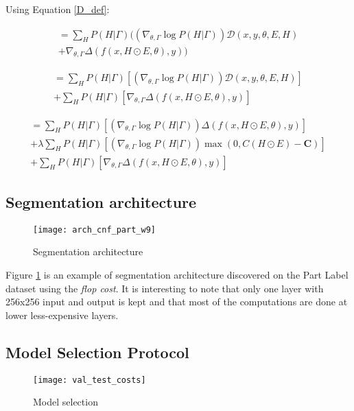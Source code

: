 \documentclass[10pt,twocolumn,letterpaper]{article}
\begin{document}
Using Equation \ref{D_def}:

\begin{multline}
= \sum\limits_H P(H|\Gamma) ((\nabla_{\theta,\Gamma} \log P(H|\Gamma)) \mathcal{D}(x,y,\theta,E,H) \\+ \nabla_{\theta,\Gamma} \Delta(f(x,H \odot E,\theta),y) )
\end{multline}

\begin{multline}
= \sum\limits_H P(H|\Gamma) \left[(\nabla_{\theta,\Gamma}  \log P(H|\Gamma)) \mathcal{D}(x,y,\theta,E,H) \right] \\+ \sum\limits_H P(H|\Gamma) \left[ \nabla_{\theta,\Gamma} \Delta(f(x,H \odot E,\theta),y) \right]
\end{multline}

\begin{multline}
= \sum\limits_H P(H|\Gamma) \left[ (\nabla_{\theta,\Gamma}  \log P(H|\Gamma)) \Delta(f(x,H \odot E,\theta),y) \right]\\
+ \lambda \sum\limits_H P(H|\Gamma) \left[ (\nabla_{\theta,\Gamma}  \log P(H|\Gamma)) \max(0, C(H \odot E) - \mathbf{C}) \right] \\
+ \sum\limits_H P(H|\Gamma) \left[ \nabla_{\theta,\Gamma} \Delta(f(x,H \odot E,\theta),y) \right]
\end{multline}

\newpage


\subsection*{Segmentation architecture}
\begin{figure}[ht]
\centering
\texttt{[image: arch\_cnf\_part\_w9]}
\caption{Segmentation architecture}
\label{fig:partlabel_arch}
\end{figure}
Figure \ref{fig:partlabel_arch} is an example of segmentation architecture discovered on the Part Label dataset using the \textit{flop cost}. It is interesting to note that only one layer with 256x256 input and output is kept and that most of the computations are done at lower less-expensive layers.

\subsection*{Model Selection Protocol}
\begin{figure}[ht]
\centering
\texttt{[image: val\_test\_costs]}
\caption{Model selection}
\label{fig:model_selection}
\end{figure}
\end{document}
